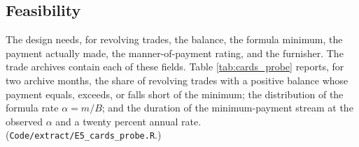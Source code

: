 \subsection{Feasibility}
The design needs, for revolving trades, the balance, the formula minimum, the payment actually made, the manner-of-payment rating, and the furnisher. The trade archives contain each of these fields. Table \ref{tab:cards_probe} reports, for two archive months, the share of revolving trades with a positive balance whose payment equals, exceeds, or falls short of the minimum; the distribution of the formula rate $\alpha = m/B$; and the duration of the minimum-payment stream at the observed $\alpha$ and a twenty percent annual rate. (\texttt{Code/extract/E5\_cards\_probe.R}.)

\begin{table}[ht]
\centering
\caption{Revolving trades in the archives: payment position, formula rate, and horizon}
\label{tab:cards_probe}

\end{table}
